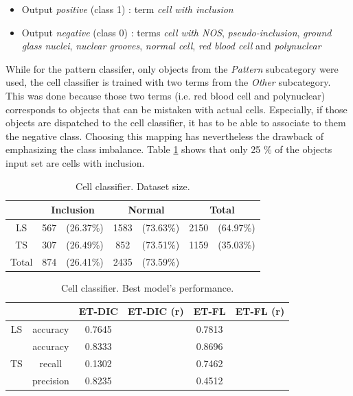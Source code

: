 \begin{itemize}
	\item Output \textit{positive} (class 1) : term \textit{cell with inclusion}
	\item Output \textit{negative} (class 0) : terms \textit{cell with NOS}, \textit{pseudo-inclusion}, \textit{ground glass nuclei}, \textit{nuclear grooves}, \textit{normal cell}, \textit{red blood cell} and \textit{polynuclear}
\end{itemize}

While for the pattern classifer, only objects from the \textit{Pattern} subcategory were used, the cell classifier is trained with two terms from the \textit{Other} subcategory. This was done because those two terms (i.e. red blood cell and polynuclear) corresponds to objects that can be mistaken with actual cells. Especially, if those objects are dispatched to the cell classifier, it has to be able to associate to them the negative class. Choosing this mapping has nevertheless the drawback of emphasizing the class imbalance. Table \ref{tab:cell_classif_dataset_size} shows that only 25 \% of the objects input set are cells with inclusion. 

\begin{table}
	\small
	\center
	\begin{tabular}{|c|cc|cc|cc|}
		\hline
		& \multicolumn{2}{|c|}{Inclusion} & \multicolumn{2}{c|}{Normal} & \multicolumn{2}{c|}{Total}\\
		\hline		
		LS & 567 & \tiny (26.37\%) & 1583 & \tiny (73.63\%) & 2150 & \tiny (64.97\%)\\
		TS & 307 & \tiny (26.49\%) & 852 & \tiny (73.51\%) & 1159 & \tiny (35.03\%)\\
		\hline
		Total & 874 & \tiny (26.41\%) & 2435 & \tiny (73.59\%) & \multicolumn{2}{c|}{}\\
		\hline
	\end{tabular}
	\caption{Cell classifier. Dataset size.}
	\label{tab:cell_classif_dataset_size}
\end{table}

\begin{table}
	\small
	\center 
	\begin{tabular}{|c|c|c|c|c|c|}
		\hline
		& & ET-DIC & ET-DIC (r) & ET-FL & ET-FL (r) \\
		\hline
		LS & accuracy & 0.7645 & & 0.7813 & \\
		\hline
		\multirow{3}{*}{TS} & accuracy & 0.8333 & & 0.8696 & \\
		& recall & 0.1302 & & 0.7462 & \\
		& precision & 0.8235 & & 0.4512 & \\
		\hline
	\end{tabular}
	\caption{Cell classifier. Best model's performance.}
	\label{tab:cell_classif_best_scores}
\end{table}


